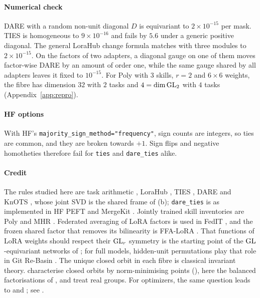 \paragraph{Numerical check} DARE with a random non-unit diagonal $D$ is equivariant to $2\times10^{-15}$ per mask.
TIES is homogeneous to $9\times10^{-16}$ and fails by $5.6$ under a generic positive diagonal. The general LoraHub
change formula matches with three modules to $2\times10^{-15}$. On the factors of two adapters, a diagonal gauge on one
of them moves factor-wise DARE by an amount of order one, while the same gauge shared by all adapters leaves it fixed to
$10^{-15}$. For Poly with $3$ skills, $r=2$ and $6\times6$ weights, the fibre has dimension $32$ with $2$ tasks and
$4=\dim\mathrm{GL}_2$ with $4$ tasks (Appendix~\ref{app:repro}).

\paragraph{HF options} With HF's \texttt{majority\_\allowbreak sign\_\allowbreak method="frequency"}, sign counts are
integers, so ties are common, and they are broken towards $+1$. Sign flips and negative homotheties therefore fail for
\texttt{ties} and \texttt{dare\_ties} alike.

\paragraph{Credit} The rules studied here are task arithmetic \citep{ilharco2022editing}, LoraHub
\citep{huang2023lorahub}, TIES \citep{yadav2023ties}, DARE \citep{yu2023language} and KnOTS \citep{stoica2024model},
whose joint SVD is the shared frame of (b); \texttt{dare\_ties} is as implemented in HF PEFT
\citep{xmangrulkar2022peft} and MergeKit \citep{xgoddard2024mergekit}. Jointly trained skill inventories are Poly
\citep{ponti2022combining} and MHR \citep{caccia2022multi}. Federated averaging of LoRA factors is used in FedIT
\citep{zhang2023building}, and the frozen shared factor that removes its bilinearity is FFA-LoRA
\citep{sun2024improving}. That functions of LoRA weights should respect their $\mathrm{GL}_r$ symmetry is the starting point of
the $\mathrm{GL}$-equivariant networks of \citet{putterman2024learning}; for full models, hidden-unit permutations play that
role in Git Re-Basin \citep{ainsworth2022git}. The unique closed orbit in each fibre is classical invariant theory.
\citet{xkempf1979length} characterise closed orbits by norm-minimising points (), here the balanced
factorisations of , and \citet{xrichardson1990minimum} treat real groups. For optimizers,
the same question leads to \citet{zhang2024riemannian} and \citet{yen2024lora}; see .

